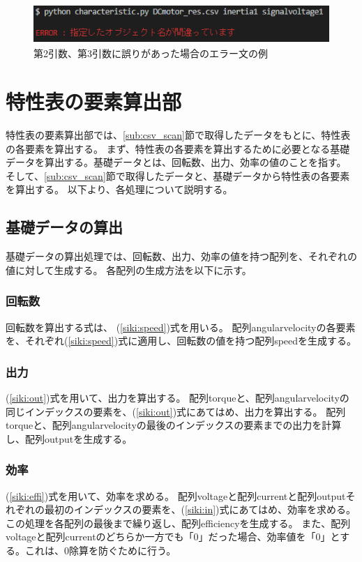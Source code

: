 \begin{figure}[t]
	\centering
	\includegraphics[width=12cm,height=1.5cm]{./Image/error_comand.png}
	\caption{第2引数、第3引数に誤りがあった場合のエラー文の例}
	\label{fig:error_comand}
\end{figure}

\section{特性表の要素算出部}\label{youso_sec}
特性表の要素算出部では、\ref{sub:csv_scan}節で取得したデータをもとに、特性表の各要素を算出する。
まず、特性表の各要素を算出するために必要となる基礎データを算出する。基礎データとは、回転数、出力、効率の値のことを指す。
そして、\ref{sub:csv_scan}節で取得したデータと、基礎データから特性表の各要素を算出する。
以下より、各処理について説明する。

\subsection{基礎データの算出}\label{sub:youso_kiso}
基礎データの算出処理では、回転数、出力、効率の値を持つ配列を、それぞれの値に対して生成する。
各配列の生成方法を以下に示す。

\subsubsection{回転数}\label{sub:sub:kaiten}
回転数を算出する式は、%
(\ref{siki:speed})式を用いる。
配列angularvelocityの各要素を、それぞれ(\ref{siki:speed})式に適用し、回転数の値を持つ配列speedを生成する。

\subsubsection{出力}\label{sub:sub:syutu}
(\ref{siki:out})式を用いて、出力を算出する。
配列torqueと、配列angularvelocityの同じインデックスの要素を、(\ref{siki:out})式にあてはめ、出力を算出する。
配列torqueと、配列angularvelocityの最後のインデックスの要素までの出力を計算し、配列outputを生成する。
\subsubsection{効率}\label{sub:sub:kouritu}
(\ref{siki:effi})式を用いて、効率を求める。
配列voltageと配列currentと配列outputそれぞれの最初のインデックスの要素を、(\ref{siki:in})式にあてはめ、効率を求める。
この処理を各配列の最後まで繰り返し、配列efficiencyを生成する。
また、配列voltageと配列currentのどちらか一方でも「0」だった場合、効率値を「0」とする。これは、0除算を防ぐために行う。
